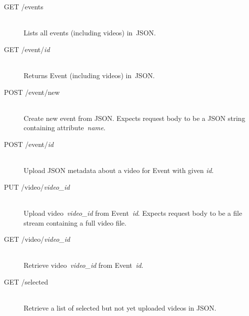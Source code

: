 \documentclass[conference]{IEEEtran}
\begin{document}
\begin{description}
	\item[GET /events]\hfill\\
		Lists all events (including videos) in~JSON.
		
	\item[GET /event/\textit{id}]\hfill\\
		Returns Event (including videos) in~JSON.
				
	\item[POST /event/new]\hfill\\
		Create new event from JSON.
		Expects request body to be a JSON string containing attribute~\textit{name}.
		
	\item[POST /event/\textit{id}]\hfill\\
		Upload JSON metadata about a video for Event with given \textit{id}.
		
	\item[PUT /video/\textit{video\_id}]\hfill\\
		Upload video~\textit{video\_id} from Event~\textit{id}.
		Expects request body to be a file stream containing a full video file.
		
	\item[GET /video/\textit{video\_id}]\hfill\\
		Retrieve video~\textit{video\_id} from Event~\textit{id}.
		
	\item[GET /selected]\hfill\\
		Retrieve a list of selected but not yet uploaded videos in JSON.		
		
\end{description}
\end{document}
